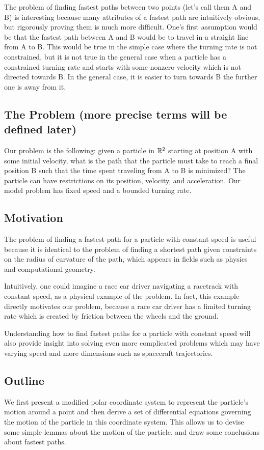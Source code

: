 The problem of finding fastest paths between two points (let's call them A and B) is interesting because many attributes of a fastest path are intuitively obvious, but rigorously proving them is much more difficult. One's first assumption would be that the fastest path between A and B would be to travel in a straight line from A to B. This would be true in the simple case where the turning rate is not constrained, but it is not true in the general case when a particle has a constrained turning rate and starts with some nonzero velocity which is not directed towards B. In the general case, it is easier to turn towards B the further one is away from it.

\subsection{The Problem (more precise terms will be defined later)}

Our problem is the following: given a particle in $\mathbb R^2$ starting at position A with some initial velocity, what is the path that the particle must take to reach a final position B such that the time spent traveling from A to B is minimized? The particle can have restrictions on its position, velocity, and acceleration. Our model problem has fixed speed and a bounded turning rate.

\subsection{Motivation}

The problem of finding a fastest path for a particle with constant speed is useful because it is identical to the problem of finding a shortest path given constraints on the radius of curvature of the path, which appears in fields such as physics and computational geometry.

Intuitively, one could imagine a race car driver navigating a racetrack with constant speed, as a physical example of the problem. In fact, this example directly motivates our problem, because a race car driver has a limited turning rate which is created by friction between the wheels and the ground.

Understanding how to find fastest paths for a particle with constant speed will also provide insight into solving even more complicated problems which may have varying speed and more dimensions such as spacecraft trajectories.

\subsection{Outline}

We first present a modified polar coordinate system to represent the particle's motion around a point and then derive a set of differential equations governing the motion of the particle in this coordinate system. This allows us to devise some simple lemmas about the motion of the particle, and draw some conclusions about fastest paths.
